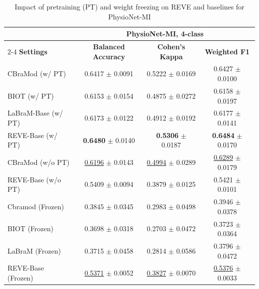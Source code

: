 \documentclass{article}
\begin{document}
\begin{table}[ht]
	\centering
    \caption{Impact of pretraining (PT) and weight freezing on REVE and baselines for PhysioNet-MI}
	\small
	\begin{tabular}{lccc} 
		\toprule
		&\multicolumn{3}{c}{\textbf{PhysioNet-MI, 4-class}}\\
    \cmidrule(lr){2-4}
        \textbf{Settings}&\textbf{Balanced Accuracy}&\textbf{Cohen’s Kappa}&\textbf{Weighted F1}\\
        \midrule
        CBraMod (w/ PT)& 0.6417 $\pm$ 0.0091& 0.5222 $\pm$ 0.0169&0.6427 $\pm$ 0.0100\\
		BIOT (w/ PT)& 0.6153 $\pm$ 0.0154&0.4875 $\pm$ 0.0272&0.6158 $\pm$ 0.0197\\
		LaBraM-Base (w/ PT)&0.6173 $\pm$ 0.0122&0.4912 $\pm$ 0.0192&0.6177 $\pm$ 0.0141\\
		REVE-Base (w/ PT)& \textbf{0.6480} $\pm$ 0.0140&\textbf{0.5306} $\pm$ 0.0187&\textbf{0.6484} $\pm$ 0.0170\\

        \midrule
        CBraMod (w/o PT)& \underline{0.6196} $\pm$ 0.0143& \underline{0.4994} $\pm$ 0.0289& \underline{0.6289}  $\pm$ 0.0179\\
        REVE-Base (w/o PT)& 0.5409 $\pm$ 0.0094& 0.3879 $\pm$ 0.0125&0.5421 $\pm$ 0.0101\\
        \midrule
		Cbramod (Frozen)&0.3845 $\pm$ 0.0345&0.2983 $\pm$ 0.0498 & 0.3946 $\pm$ 0.0378\\
		BIOT (Frozen)&0.3698 $\pm$ 0.0318&0.2703 $\pm$ 0.0472&0.3723 $\pm$ 0.0364\\
		LaBraM (Frozen)&0.3715 $\pm$ 0.0458&0.2814 $\pm$ 0.0586&0.3796 $\pm$ 0.0472\\
        REVE-Base (Frozen)& \underline{0.5371} $\pm$ 0.0052& \underline{0.3827} $\pm$ 0.0070& \underline{0.5376} $\pm$ 0.0033\\
		\bottomrule
	\end{tabular}
    
    
	\label{tab:result_FT}
\end{table}
\end{document}
